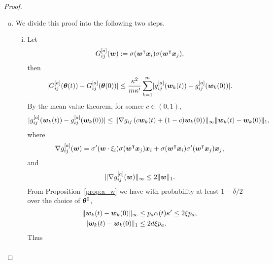 \documentclass[twoside,11pt]{article}
\begin{document}
\begin{proof}
\begin{enumerate}[(a)]
        \item We divide this proof into the following two steps.
              \begin{enumerate}[(i)]
                  \item Let
                        \begin{equation*}
                            G^{[a]}_{ij}(\bm{w}) := \sigma(\bm{w}^\intercal\bm{x}_i)\sigma(\bm{w}^\intercal\bm{x}_j),
                        \end{equation*}
                        then
                        \begin{equation*}
                            \lvert G_{ij}^{[a]}(\bm{\theta}(t)) - G_{ij}^{[a]}(\bm{\theta}(0))\rvert \leq \frac{\kappa^2}{m\kappa'}\sum_{k=1}^m \lvert g^{[a]}_{ij}(\bm{w}_k(t)) - g^{[a]}_{ij}(\bm{w}_k(0))\rvert.
                        \end{equation*}
                        By the mean value theorem, for somce $c\in(0,1)$,
                        \begin{equation*}
                            \lvert g^{[a]}_{ij}(\bm{w}_k(t)) - g^{[a]}_{ij}(\bm{w}_k(0))\rvert \leq \lVert\nabla g_{ij}\left(c\bm{w}_k(t) + (1-c)\bm{w}_k(0)\right)\rVert_{\infty}\lVert\bm{w}_k(t) - \bm{w}_k(0)\rVert_1,
                        \end{equation*}
                        where
                        \begin{equation*}
                            \nabla g_{ij}^{[a]}(\bm{w})=\sigma'(\bm{w}\cdot\xi_i)\sigma(\bm{w}^\intercal\bm{x}_j)\bm{x}_i+\sigma(\bm{w}^\intercal\bm{x}_i)\sigma'(\bm{w}^\intercal\bm{x}_j)\bm{x}_j,
                        \end{equation*}
                        and
                        \begin{equation*}
                            \lVert\nabla g_{ij}^{[a]}(\bm{w})\rVert_{\infty}\leq 2\lVert\bm{w}\rVert_1.
                        \end{equation*}
                        From Proposition~\ref{prop:a_w} we have with probability at least $1-\delta/2$ over the choice of $\bm{\theta}^0$,
                        \begin{align*}
                            \lVert\bm{w}_k(t)-\bm{w}_k(0)\rVert_{\infty} & \leq p_a\alpha(t)\kappa'\leq 2\xi p_a, \\
                            \lVert\bm{w}_k(t)-\bm{w}_k(0)\rVert_1        & \leq 2d\xi p_a.
                        \end{align*}
                        Thus
                        \begin{equation*}
                            \begin{aligned}

\end{aligned}
\end{equation*}
\end{enumerate}
\end{enumerate}
\end{proof}
\end{document}
